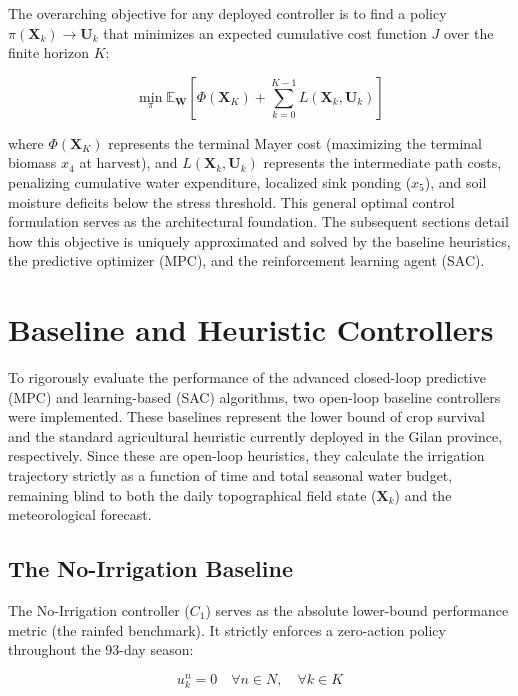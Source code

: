 \documentclass[11pt, a4paper]{article}
\begin{document}
The overarching objective for any deployed controller is to find a policy $\pi(\mathbf{X}_k) \to \mathbf{U}_k$ that minimizes an expected cumulative cost function $J$ over the finite horizon $K$:

\begin{equation}
    \min_{\pi} \mathbb{E}_{\mathbf{W}} \left[ \Phi(\mathbf{X}_K) + \sum_{k=0}^{K-1} L(\mathbf{X}_k, \mathbf{U}_k) \right]
\end{equation}

where $\Phi(\mathbf{X}_K)$ represents the terminal Mayer cost (maximizing the terminal biomass $x_4$ at harvest), and $L(\mathbf{X}_k, \mathbf{U}_k)$ represents the intermediate path costs, penalizing cumulative water expenditure, localized sink ponding ($x_5$), and soil moisture deficits below the stress threshold. This general optimal control formulation serves as the architectural foundation. The subsequent sections detail how this objective is uniquely approximated and solved by the baseline heuristics, the predictive optimizer (MPC), and the reinforcement learning agent (SAC).

\section{Baseline and Heuristic Controllers}

To rigorously evaluate the performance of the advanced closed-loop predictive (MPC) and learning-based (SAC) algorithms, two open-loop baseline controllers were implemented. These baselines represent the lower bound of crop survival and the standard agricultural heuristic currently deployed in the Gilan province, respectively. Since these are open-loop heuristics, they calculate the irrigation trajectory strictly as a function of time and total seasonal water budget, remaining blind to both the daily topographical field state ($\mathbf{X}_k$) and the meteorological forecast.

\subsection{The No-Irrigation Baseline}

The No-Irrigation controller ($C_1$) serves as the absolute lower-bound performance metric (the rainfed benchmark). It strictly enforces a zero-action policy throughout the 93-day season:

\begin{equation}
    u^n_k = 0 \quad \forall n \in N, \quad \forall k \in K
\end{equation}
\end{document}
